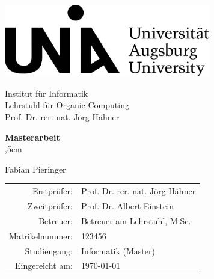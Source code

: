\begin{titlepage}
\begin{large}
\begin{center}
\includegraphics[width=9cm]{uni-augsburg-logo.jpg}

Institut f\"ur Informatik\\
Lehrstuhl f\"ur Organic Computing\\
Prof. Dr. rer. nat. J\"org H\"ahner\\
\vskip 2cm



\textbf{\Large Masterarbeit}\\
,5cm
{\LARGE\bfseries\textsf \titel \par}
\vfill

{\huge Fabian Pieringer}\\
\vfill


\end{center}
\vfill
\newpage
\thispagestyle{empty}
\begin{tabular}{rl}
Erstpr\"ufer: & Prof. Dr. rer. nat. J\"org H\"ahner\\
Zweitpr\"ufer: & Prof. Dr. Albert Einstein\\
Betreuer: & Betreuer am Lehrstuhl, M.Sc.\\
Matrikelnummer: & 123456\\
Studiengang: & Informatik (Master)\\
Eingereicht am: & \today\\
\end{tabular}
\end{large}
\end{titlepage}